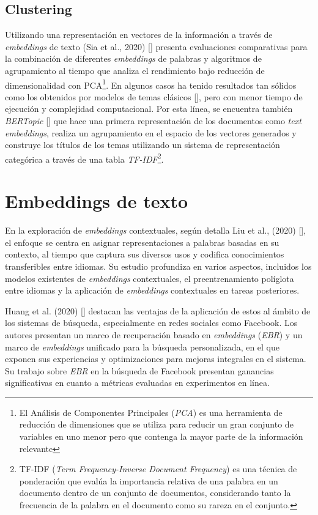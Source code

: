     \subsection{Clustering}
    Utilizando una representación en vectores de la información a través de \emph{embeddings} de texto (Sia et al., 2020) [\cite{sia2020tired}] presenta evaluaciones comparativas para la combinación de diferentes \emph{embeddings} de palabras y algoritmos de agrupamiento al tiempo que analiza el rendimiento bajo reducción de dimensionalidad con PCA\footnote{El Análisis de Componentes Principales (\emph{PCA}) es una herramienta de reducción de dimensiones que se utiliza para reducir un gran conjunto de variables en uno menor pero que contenga la mayor parte de la información relevante}. En algunos casos ha tenido resultados tan sólidos como los obtenidos por modelos de temas clásicos [\cite{sia2020tiredResults}], pero con menor tiempo de ejecución y complejidad computacional. 
    Por esta línea, se encuentra también \emph{BERTopic} [\cite{bertopic}] que hace una primera representación de los documentos como \emph{text embeddings}, realiza un agrupamiento en el espacio de los vectores generados y construye los títulos de los temas utilizando un sistema de representación categórica a través de una tabla \emph{TF-IDF}\footnote{TF-IDF (\emph{Term Frequency-Inverse Document Frequency}) es una técnica de ponderación que evalúa la importancia relativa de una palabra en un documento dentro de un conjunto de documentos, considerando tanto la frecuencia de la palabra en el documento como su rareza en el conjunto.}.

\section{Embeddings de texto}
    En la exploración de \emph{embeddings} contextuales, según detalla Liu et al., (2020) [\cite{liu2020survey}], el enfoque se centra en asignar representaciones a palabras basadas en su contexto, al tiempo que captura sus diversos usos y codifica conocimientos transferibles entre idiomas. Su estudio profundiza en varios aspectos, incluidos los modelos existentes de \emph{embeddings} contextuales, el preentrenamiento políglota entre idiomas y la aplicación de \emph{embeddings} contextuales en tareas posteriores.

    Huang et al. (2020) [\cite{Huang_2020}] destacan las ventajas de la aplicación de estos al ámbito de los sistemas de búsqueda, especialmente en redes sociales como Facebook. Los autores presentan un marco de recuperación basado en \emph{embeddings} (\emph{EBR}) y un marco de \emph{embeddings} unificado para la búsqueda personalizada, en el que exponen sus experiencias y optimizaciones para mejoras integrales en el sistema. Su trabajo sobre \emph{EBR} en la búsqueda de Facebook presentan ganancias significativas en cuanto a métricas evaluadas en experimentos en línea.


